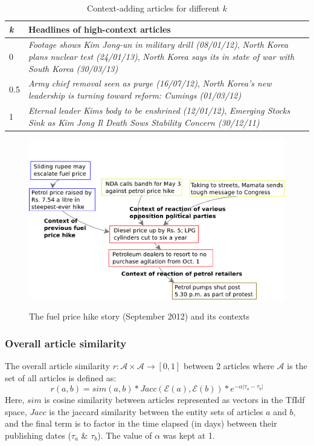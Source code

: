 \begin{table}
\small
\begin{tabular}{|l|p{7cm}|}
\hline
{\bf {\em k}} & {\bf Headlines of high-context articles}\\
\hline
0 & {\em Footage shows Kim Jong-un in military drill (08/01/12)}, {\em North Korea plans nuclear test (24/01/13)}, {\em North Korea says its in state of war with South Korea (30/03/13)}\\
\hline
0.5 & {\em Army chief removal seen as purge (16/07/12)}, {\em North Korea's new leadership is turning toward reform: Cumings (01/03/12)}\\
\hline
1 & {\em Eternal leader Kims body to be enshrined (12/01/12)}, {\em Emerging Stocks Sink as Kim Jong Il Death Sows Stability Concern (30/12/11)}\\
\hline
\end{tabular}
\caption{Context-adding articles for different $k$}
\label{tab:different-contexts}
\end{table}
\begin{figure}
\caption{The fuel price hike story (September 2012) and its contexts}
\includegraphics[scale=0.30]{figures/graph-petrol.pdf}
\label{fig:petrol}
\end{figure}

\subsubsection*{Overall article similarity}
\label{subsec:article_similarity}
The overall article similarity $r:\mathcal{A} \times \mathcal{A} \rightarrow [0,1]$ between 2 articles where $\mathcal{A}$ is the set of all articles is defined as:
\begin{equation}
r(a, b) = sim(a,b) * Jacc(\mathcal{E}(a), \mathcal{E}(b)) * e^{-\alpha|\tau_a - \tau_b|}
\end{equation}
Here, $sim$ is cosine similarity between articles represented as vectors in the TfIdf space, $Jacc$ is the jaccard similarity between
the entity sets of articles $a$ and $b$, and the final term is to factor in the time elapsed (in days) between their publishing dates ($\tau_a$ \& $\tau_b$).
The value of $\alpha$ was kept at 1. 

